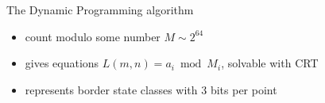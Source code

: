 \documentclass{prosper}
\begin{document}
\begin{slide}{The Dynamic Programming algorithm}
\begin{itemize}
\item count modulo some number $M \sim 2^{64}$
\item gives equations $L(m,n) = a_i \bmod M_i$, solvable with CRT
\item represents border state classes with 3 bits per point \\


\end{itemize}
\end{slide}
\end{document}
